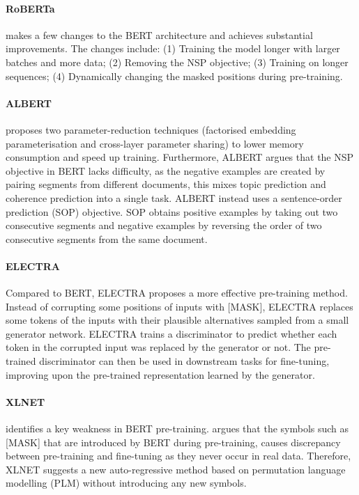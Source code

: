 \paragraph{RoBERTa} \cite{liu2019roberta} makes a few changes to the BERT architecture and achieves substantial improvements. The changes include: (1) Training the model longer with larger batches and more data; (2) Removing the NSP objective; (3) Training on longer sequences; (4) Dynamically changing the masked positions during pre-training.

\paragraph{ALBERT} \cite{Lan2020ALBERT} proposes two parameter-reduction techniques (factorised embedding parameterisation and cross-layer parameter sharing) to lower memory consumption and speed up training. Furthermore, ALBERT \cite{Lan2020ALBERT} argues that the NSP objective in BERT lacks difficulty, as the negative examples are created by pairing segments from different documents, this mixes topic prediction and coherence prediction into a single task. ALBERT instead uses a sentence-order prediction
(SOP) objective. SOP obtains positive examples by taking out two consecutive segments and negative examples by reversing the order of two consecutive segments from the same document.


\paragraph{ELECTRA} Compared to BERT, ELECTRA \cite{Clark2020ELECTRA} proposes a more effective pre-training method. Instead of corrupting some positions of inputs with [MASK], ELECTRA replaces some tokens of the inputs with their plausible alternatives sampled from a small generator network. ELECTRA trains a discriminator to predict whether each token in the corrupted input was replaced by the generator or not. The pre-trained discriminator can then be used in downstream tasks for fine-tuning, improving upon the pre-trained representation learned by the generator.

\paragraph{XLNET} \cite{yang2019xlnet} identifies a key weakness in BERT pre-training. \citet{yang2019xlnet} argues that the symbols such as \textsc{[MASK]} that are introduced by BERT during pre-training, causes discrepancy between pre-training and fine-tuning as they never occur in real data. Therefore, XLNET suggests a new auto-regressive method based on permutation language modelling (PLM) \cite{JMLR:v17:16-272} without introducing any new symbols. 

